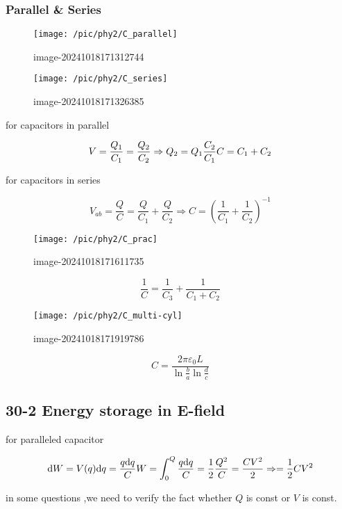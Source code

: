 \documentclass[
]{article}
\begin{document}
\hypertarget{parallel-series}{%
\subsubsection{Parallel \& Series}\label{parallel-series}}

\begin{figure}
\centering
\texttt{[image: /pic/phy2/C\_parallel]}
\caption{image-20241018171312744}
\end{figure}

\begin{figure}
\centering
\texttt{[image: /pic/phy2/C\_series]}
\caption{image-20241018171326385}
\end{figure}

for capacitors in parallel

\[
V=\frac{Q_1}{C_1}=\frac{Q_2}{C_2}\Rightarrow Q_2=Q_1\frac{C_2}{C_1}\\C=C_1+C_2
\]

for capacitors in series

\[
V_{ab}=\frac{Q}{C}=\frac{Q}{C_1}+\frac{Q}{C_2}\Rightarrow C=\left(\frac{1}{C_1}+\frac{1}{C_2}\right)^{-1}
\]

\begin{figure}
\centering
\texttt{[image: /pic/phy2/C\_prac]}
\caption{image-20241018171611735}
\end{figure}

\[
\frac{1}{C}=\frac{1}{C_3}+\frac{1}{C_1+C_2}
\]

\begin{figure}
\centering
\texttt{[image: /pic/phy2/C\_multi-cyl]}
\caption{image-20241018171919786}
\end{figure}

\[
C=\frac{2\pi \varepsilon _0L}{\ln\frac{b}{a}\ln \frac{d}{c}}
\]

\hypertarget{energy-storage-in-e-field}{%
\subsection{30-2 Energy storage in
E-field}\label{energy-storage-in-e-field}}

for paralleled capacitor

\[
\mathrm d W=V(q)\mathrm d q=\frac{q\mathrm d q}{C}\\
W=\int _{0}^ Q \frac{q\mathrm dq}{C}=\frac{1}{2}\frac{Q^2}{C}=\frac{CV^2}{2}\Rightarrow =\frac{1}{2}CV^2
\]

in some questions ,we need to verify the fact whether \(Q\) is const or
\(V\) is const.
\end{document}
